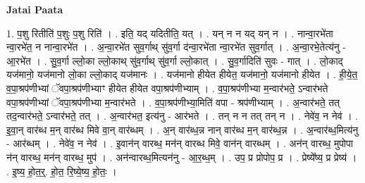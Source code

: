 \documentclass[17pt]{extarticle}
\begin{document}
\textbf{Jatai Paata} \newline

1. प॒शु रितीति॑ प॒शुः प॒शु रिति॑ । . इति॒ यद् यदितीति॒ यत् । . यन् न न यद् यन् न । . नान्वा॒रभे॑ता न्वा॒रभे॑त॒ न नान्वा॒रभे॑त । . अ॒न्वा॒रभे॑त सुव॒र्गाथ् सु॑व॒र्गा द॑न्वा॒रभे॑ता न्वा॒रभे॑त सुव॒र्गात् । . अ॒न्वा॒रभे॒तेत्य॑नु - आ॒रभे॑त । . सु॒व॒र्गा ल्लो॒का ल्लो॒काथ् सु॑व॒र्गाथ् सु॑व॒र्गा ल्लो॒कात् । . सु॒व॒र्गादिति॑ सुवः - गात् । . लो॒काद् यज॑मानो॒ यज॑मानो लो॒का ल्लो॒काद् यज॑मानः । . यज॑मानो हीयेत हीयेत॒ यज॑मानो॒ यज॑मानो हीयेत । . ही॒ये॒त॒ व॒पा॒श्रप॑णीभ्यां ॅवपा॒श्रप॑णीभ्याꣳ हीयेत हीयेत वपा॒श्रप॑णीभ्याम् । . व॒पा॒श्रप॑णीभ्या म॒न्वार॑भते॒ ऽन्वार॑भते वपा॒श्रप॑णीभ्यां ॅवपा॒श्रप॑णीभ्या म॒न्वार॑भते । . व॒पा॒श्रप॑णीभ्या॒मिति॑ वपा - श्रप॑णीभ्याम् । . अ॒न्वार॑भते॒ तत् तद॒न्वार॑भते॒ ऽन्वार॑भते॒ तत् । . अ॒न्वार॑भत॒ इत्य॑नु - आर॑भते । . तन् न न तत् तन् न । . नेवे॑व॒ न नेव॑ । . इ॒वा॒न् वार॑ब्ध म॒न् वार॑ब्ध मिवे वा॒न् वार॑ब्धम् । . अ॒न् वार॑ब्ध॒न्न नान् वार॑ब्ध म॒न् वार॑ब्ध॒न्न । . अ॒न्वार॑ब्ध॒मित्य॑नु - आर॑ब्धम् । . नेवे॑व॒ न नेव॑ । . इ॒वान॑न् वारब्ध॒ मन॑न् वारब्ध मिवे॒ वान॑न् वारब्धम् । . अन॑न् वारब्ध॒ मुपोपा न॑न् वारब्ध॒ मन॑न् वारब्ध॒ मुप॑ । . अन॑न्वारब्ध॒मित्यन॑नु - आ॒र॒ब्ध॒म् । . उप॒ प्र प्रोपोप॒ प्र । . प्रेष्ये᳚ष्य॒ प्र प्रेष्य॑ । . इ॒ष्य॒ हो॒त॒र्॒. हो॒त॒ रि॒ष्ये॒ष्य॒ हो॒तः॒ । \newline
\end{document}
